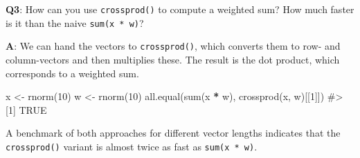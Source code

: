 \documentclass[
]{krantz}
\makeatletter
\newenvironment{Shaded}{\begin{snugshade}}{\end{snugshade}}
\newcommand{\CommentTok}[1]{\textcolor[rgb]{0.56,0.35,0.01}{\textit{#1}}}
\newcommand{\DataTypeTok}[1]{\textcolor[rgb]{0.13,0.29,0.53}{#1}}
\newcommand{\DecValTok}[1]{\textcolor[rgb]{0.00,0.00,0.81}{#1}}
\newcommand{\FloatTok}[1]{\textcolor[rgb]{0.00,0.00,0.81}{#1}}
\newcommand{\KeywordTok}[1]{\textcolor[rgb]{0.13,0.29,0.53}{\textbf{#1}}}
\newcommand{\NormalTok}[1]{#1}
\newcommand{\OperatorTok}[1]{\textcolor[rgb]{0.81,0.36,0.00}{\textbf{#1}}}
\newcommand{\StringTok}[1]{\textcolor[rgb]{0.31,0.60,0.02}{#1}}
\newenvironment{kframe}{%
\medskip{}
\setlength{\fboxsep}{.8em}
 \def\at@end@of@kframe{}%
 \ifinner\ifhmode%
  \def\at@end@of@kframe{\end{minipage}}%
  \begin{minipage}{\columnwidth}%
 \fi\fi%
 \def\FrameCommand##1{\hskip\@totalleftmargin \hskip-\fboxsep
 \colorbox{shadecolor}{##1}\hskip-\fboxsep
     \hskip-\linewidth \hskip-\@totalleftmargin \hskip\columnwidth}%
 \MakeFramed {\advance\hsize-\width
   \@totalleftmargin\z@ \linewidth\hsize
   \@setminipage}}%
 {\par\unskip\endMakeFramed%
 \at@end@of@kframe}
\renewenvironment{Shaded}{\begin{kframe}}{\end{kframe}}
\renewcommand{\KeywordTok} [1]{\textcolor[rgb]{0.00,0.44,0.13}{{#1}}}
\renewcommand{\DataTypeTok}[1]{\textcolor[rgb]{0.56,0.13,0.00}{{#1}}}
\renewcommand{\DecValTok}  [1]{\textcolor[rgb]{0.25,0.63,0.44}{{#1}}}
\renewcommand{\FloatTok}   [1]{\textcolor[rgb]{0.25,0.63,0.44}{{#1}}}
\renewcommand{\StringTok}  [1]{\textcolor[rgb]{0.25,0.44,0.63}{{#1}}}
\renewcommand{\CommentTok} [1]{\textcolor[rgb]{0.38,0.63,0.69}{{#1}}}
\renewcommand{\NormalTok}  [1]{{#1}}
\makeatother
\begin{document}
\textbf{{Q3}}: How can you use \texttt{crossprod()} to compute a weighted sum? How much faster is it than the naive \texttt{sum(x\ *\ w)}?

\textbf{{A}}: We can hand the vectors to \texttt{crossprod()}, which converts them to row- and column-vectors and then multiplies these. The result is the dot product, which corresponds to a weighted sum.

\begin{Shaded}
\begin{Highlighting}[]
\NormalTok{x <-}\StringTok{ }\KeywordTok{rnorm}\NormalTok{(}\DecValTok{10}\NormalTok{)}
\NormalTok{w <-}\StringTok{ }\KeywordTok{rnorm}\NormalTok{(}\DecValTok{10}\NormalTok{)}
\KeywordTok{all.equal}\NormalTok{(}\KeywordTok{sum}\NormalTok{(x }\OperatorTok{*}\StringTok{ }\NormalTok{w), }\KeywordTok{crossprod}\NormalTok{(x, w)[[}\DecValTok{1}\NormalTok{]])}
\CommentTok{#> [1] TRUE}
\end{Highlighting}
\end{Shaded}

A benchmark of both approaches for different vector lengths indicates that the \texttt{crossprod()} variant is almost twice as fast as \texttt{sum(x\ *\ w)}.

\begin{Shaded}
\end{Shaded}
\end{document}

